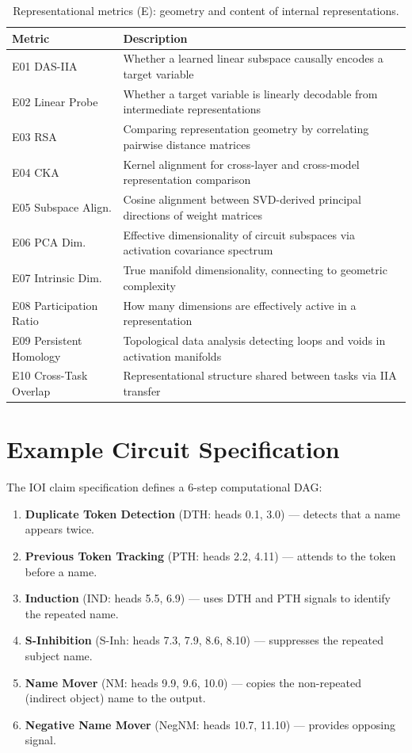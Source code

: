 \documentclass[10pt]{article}
\begin{document}
\begin{table}[H]
\centering
\small
\caption{Representational metrics (E): geometry and content of internal representations.}
\renewcommand{\arraystretch}{1.12}
\begin{tabular}{@{}lp{10cm}@{}}
\toprule
\textbf{Metric} & \textbf{Description} \\
\midrule
E01 DAS-IIA & Whether a learned linear subspace causally encodes a target variable \\
E02 Linear Probe & Whether a target variable is linearly decodable from intermediate representations \\
E03 RSA & Comparing representation geometry by correlating pairwise distance matrices \\
E04 CKA & Kernel alignment for cross-layer and cross-model representation comparison \\
E05 Subspace Align. & Cosine alignment between SVD-derived principal directions of weight matrices \\
E06 PCA Dim. & Effective dimensionality of circuit subspaces via activation covariance spectrum \\
E07 Intrinsic Dim. & True manifold dimensionality, connecting to geometric complexity \\
E08 Participation Ratio & How many dimensions are effectively active in a representation \\
E09 Persistent Homology & Topological data analysis detecting loops and voids in activation manifolds \\
E10 Cross-Task Overlap & Representational structure shared between tasks via IIA transfer \\
\bottomrule
\end{tabular}
\end{table}

\section{Example Circuit Specification}
\label{app:ioi-spec}

The IOI claim specification defines a 6-step computational DAG:

\begin{enumerate}[nosep]
    \item \textbf{Duplicate Token Detection} (DTH: heads 0.1, 3.0) --- detects that a name appears twice.
    \item \textbf{Previous Token Tracking} (PTH: heads 2.2, 4.11) --- attends to the token before a name.
    \item \textbf{Induction} (IND: heads 5.5, 6.9) --- uses DTH and PTH signals to identify the repeated name.
    \item \textbf{S-Inhibition} (S-Inh: heads 7.3, 7.9, 8.6, 8.10) --- suppresses the repeated subject name.
    \item \textbf{Name Mover} (NM: heads 9.9, 9.6, 10.0) --- copies the non-repeated (indirect object) name to the output.
    \item \textbf{Negative Name Mover} (NegNM: heads 10.7, 11.10) --- provides opposing signal.
\end{enumerate}
\end{document}
